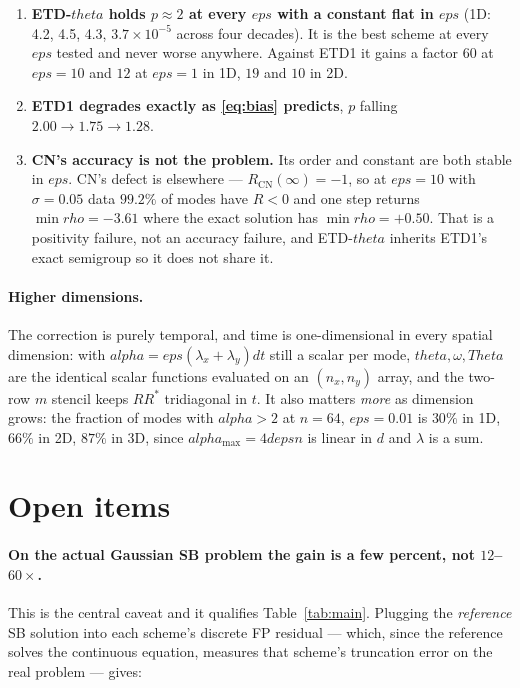 \documentclass[11pt]{article}
\newcommand{\eps}{\varepsilon}
\newcommand{\dt}{\Delta t}
\newcommand{\dx}{\Delta x}
\newcommand{\code}[1]{\texttt{#1}}
\def\theta{theta}\def\Theta{Theta}\def\alpha{alpha}\def\rho{rho}%
\def\eps{eps}\def\dt{dt}\def\dx{dx}\def\code#1{#1}%
\begin{document}
\begin{enumerate}
  \item \textbf{ETD-$\theta$ holds $p\approx2$ at every $\eps$ with a constant flat in
        $\eps$} (1D: 4.2, 4.5, 4.3, $3.7\times10^{-5}$ across four decades). It is the
        best scheme at every $\eps$ tested and never worse anywhere. Against ETD1 it
        gains a factor $60$ at $\eps=10$ and $12$ at $\eps=1$ in 1D, $19$ and $10$ in 2D.
  \item \textbf{ETD1 degrades exactly as \eqref{eq:bias} predicts}, $p$ falling
        $2.00\to1.75\to1.28$.
  \item \textbf{CN's accuracy is not the problem.} Its order and constant are both stable
        in $\eps$. CN's defect is elsewhere --- $R_{\mathrm{CN}}(\infty)=-1$, so at
        $\eps=10$ with $\sigma=0.05$ data $99.2\%$ of modes have $R<0$ and one step
        returns $\min\rho=-3.61$ where the exact solution has $\min\rho=+0.50$. That is
        a positivity failure, not an accuracy failure, and ETD-$\theta$ inherits ETD1's
        exact semigroup so it does not share it.
\end{enumerate}

\paragraph{Higher dimensions.} The correction is purely temporal, and time is
one-dimensional in every spatial dimension: with
$\alpha=\eps(\lambda_x+\lambda_y)\dt$ still a scalar per mode, $\theta,\omega,\Theta$ are
the identical scalar functions evaluated on an $(n_x,n_y)$ array, and the two-row $m$
stencil keeps $RR^*$ tridiagonal in $t$. It also matters \emph{more} as dimension grows:
the fraction of modes with $\alpha>2$ at $n=64$, $\eps=0.01$ is $30\%$ in 1D, $66\%$ in
2D, $87\%$ in 3D, since $\alpha_{\max}=4d\eps n$ is linear in $d$ and $\lambda$ is a sum.

\section{Open items}
\label{sec:open}

\paragraph{On the actual Gaussian SB problem the gain is a few percent, not
$12$--$60\times$.} This is the central caveat and it qualifies
Table~\ref{tab:main}. Plugging the \emph{reference} SB solution into each
scheme's discrete FP residual --- which, since the reference solves the
continuous equation, measures that scheme's truncation error on the real
problem --- gives:
\end{document}
